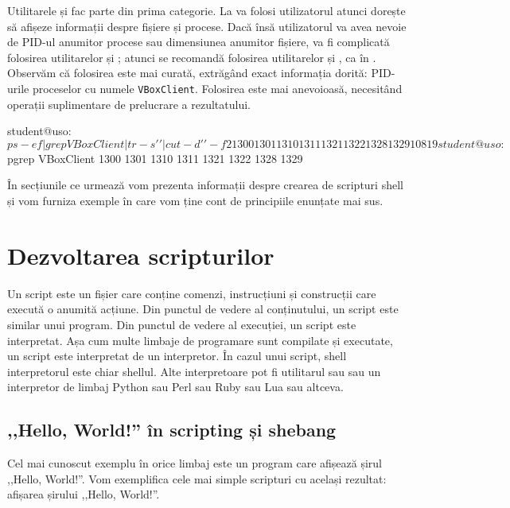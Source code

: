 Utilitarele  și  fac parte din prima categorie.
La va folosi utilizatorul atunci dorește să afișeze informații despre fișiere și procese.
Dacă însă utilizatorul va avea nevoie de PID-ul anumitor procese sau dimensiunea anumitor fișiere, va fi complicată folosirea utilitarelor  și ; atunci se recomandă folosirea utilitarelor  și , ca în .
Observăm că folosirea  este mai curată, extrăgând exact informația dorită: PID-urile proceselor cu numele \texttt{VBoxClient}.
Folosirea  este mai anevoioasă, necesitând operații suplimentare de prelucrare a rezultatului.

\begin{screen}[caption={Utiltare pentru afișare și pentru prelucrare},label={lst:auto:print-vs-process-cmd}]
student@uso:~$ ps -ef | grep VBoxClient | tr -s ' ' | cut -d ' ' -f 2
1300
1301
1310
1311
1321
1322
1328
1329
10819
student@uso:~$ pgrep VBoxClient
1300
1301
1310
1311
1321
1322
1328
1329
\end{screen}

În secțiunile ce urmează vom prezenta informații despre crearea de scripturi shell și vom furniza exemple în care vom ține cont de principiile enunțate mai sus.

\section{Dezvoltarea scripturilor}
\label{sec:auto:dev}

Un script este un fișier care conține comenzi, instrucțiuni și construcții care execută o anumită acțiune.
Din punctul de vedere al conținutului, un script este similar unui program.
Din punctul de vedere al execuției, un script este interpretat.
Așa cum multe limbaje de programare sunt compilate și executate, un script este interpretat de un interpretor.
În cazul unui script, shell interpretorul este chiar shellul.
Alte interpretoare pot fi utilitarul  sau  sau un interpretor de limbaj Python sau Perl sau Ruby sau Lua sau altceva.

\subsection{,,Hello, World!'' în scripting și shebang}
\label{sec:auto:dev:hello}

Cel mai cunoscut exemplu în orice limbaj este un program care afișează șirul ,,Hello, World!''.
Vom exemplifica cele mai simple scripturi cu același rezultat: afișarea șirului ,,Hello, World!''.

